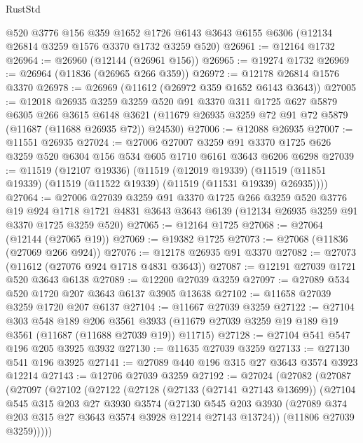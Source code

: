 \begin{lexlean}{RustStd}
\begin{coremodule}
    @520
    @3776
    @156
    @359
    @1652
    @1726
    @6143
    @3643
    @6155
    @6306
    (@12134 @26814 @3259 @1576 @3370 @1732 @3259 @520)
@26961 := @12164 @1732
@26964 := @26960 (@12144 (@26961 @156))
@26965 := @19274 @1732
@26969 := @26964 (@11836 (@26965 @266 @359))
@26972 := @12178 @26814 @1576 @3370
@26978 := @26969 (@11612 (@26972 @359 @1652 @6143 @3643))
@27005 := @12018
    @26935
    @3259
    @3259
    @520
    @91
    @3370
    @311
    @1725
    @627
    @5879
    @6305
    @266
    @3615
    @6148
    @3621
    (@11679 @26935 @3259 @72 @91 @72 @5879 (@11687 (@11688 @26935 @72)) @24530)
@27006 := @12088 @26935
@27007 := @11551 @26935
@27024 := @27006
    @27007
    @3259
    @91
    @3370
    @1725
    @626
    @3259
    @520
    @6304
    @156
    @534
    @605
    @1710
    @6161
    @3643
    @6206
    @6298
@27039 := @11519
    (@12107 @19336)
    (@11519
      (@12019 @19339)
      (@11519 (@11851 @19339) (@11519 (@11522 @19339) (@11519 (@11531 @19339) @26935))))
@27064 := @27006
    @27039
    @3259
    @91
    @3370
    @1725
    @266
    @3259
    @520
    @3776
    @19
    @924
    @1718
    @1721
    @4831
    @3643
    @3643
    @6139
    (@12134 @26935 @3259 @91 @3370 @1725 @3259 @520)
@27065 := @12164 @1725
@27068 := @27064 (@12144 (@27065 @19))
@27069 := @19382 @1725
@27073 := @27068 (@11836 (@27069 @266 @924))
@27076 := @12178 @26935 @91 @3370
@27082 := @27073 (@11612 (@27076 @924 @1718 @4831 @3643))
@27087 := @12191 @27039 @1721 @520 @3643 @6138
@27089 := @12200 @27039 @3259
@27097 := @27089 @534 @520 @1720 @207 @3643 @6137 @3905 @13638
@27102 := @11658 @27039 @3259 @1720 @207 @6137
@27104 := @11667 @27039 @3259
@27122 := @27104
    @303
    @548
    @189
    @206
    @3561
    @3933
    (@11679 @27039 @3259 @19 @189 @19 @3561 (@11687 (@11688 @27039 @19)) @11715)
@27128 := @27104 @541 @547 @196 @205 @3925 @3932
@27130 := @11635 @27039 @3259
@27133 := @27130 @541 @196 @3925
@27141 := @27089 @440 @196 @315 @27 @3643 @3574 @3923 @12214
@27143 := @12706 @27039 @3259
@27192 := @27024
    (@27082
      (@27087
        (@27097
          (@27102
            (@27122
              (@27128
                (@27133 (@27141 @27143 @13699))
                (@27104
                  @545
                  @315
                  @203
                  @27
                  @3930
                  @3574
                  (@27130
                    @545
                    @203
                    @3930
                    (@27089 @374 @203 @315 @27 @3643 @3574 @3928 @12214 @27143 @13724))
                  (@11806 @27039 @3259)))))

\end{coremodule}
\end{lexlean}
